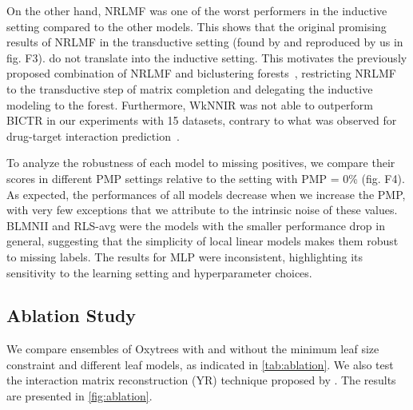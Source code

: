 \documentclass[letterpaper]{article}
\begin{document}
On the other hand, NRLMF was one of the worst performers in the inductive setting compared to the other models. This shows that the original promising results of NRLMF in the transductive setting (found by \citet{liu_neighborhood_2016,liu_lpi-nrlmf_2017,liu_predicting_2020} and reproduced by us in
fig. F3).
do not translate into the inductive setting. This motivates the previously proposed combination of NRLMF and biclustering forests~\cite{pliakos_drug-target_2020}, restricting NRLMF to the transductive step of matrix completion and delegating the inductive modeling to the forest.
Furthermore, WkNNIR was not able to outperform BICTR in our experiments with 15 datasets, contrary to what was observed for drug-target interaction prediction~\cite{liu_drug-target_2022}.

To analyze the robustness of each model to missing positives, we compare their scores in different PMP settings relative to the setting with PMP = 0\%
(fig. F4).
As expected, the performances of all models decrease when we increase the PMP, with very few exceptions that we attribute to the intrinsic noise of these values.
BLMNII and RLS-avg were the models with the smaller performance drop in general, suggesting that the simplicity of local linear models makes them robust to missing labels.
The results for MLP were inconsistent, highlighting its sensitivity to the learning setting and hyperparameter choices.



\subsection{Ablation Study}
\label{sec:ablation}

We compare ensembles of Oxytrees with and without the minimum leaf size constraint and different leaf models, as indicated in \cref{tab:ablation}. We also test the interaction matrix reconstruction (YR) technique proposed by \citet{pliakos_drug-target_2020}.
The results are presented in \cref{fig:ablation}.
\end{document}

